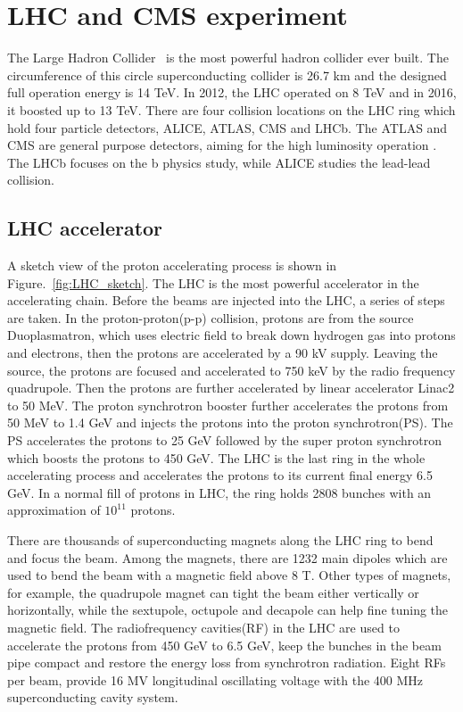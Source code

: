 \chapter{LHC and CMS experiment}

The Large Hadron Collider~\cite{LHC_refer} is the most powerful hadron collider ever built. The circumference of this circle superconducting collider is 26.7 km and the designed full operation energy is 14 TeV. In 2012, the LHC operated on 8 TeV and in 2016, it boosted up to 13 TeV. There are four collision locations on the LHC ring which hold four particle detectors, ALICE, ATLAS, CMS and LHCb. The ATLAS and CMS are general purpose detectors, aiming for the high luminosity operation . The LHCb focuses on the b physics study, while ALICE studies the lead-lead collision.
\section{LHC accelerator}

A sketch view of the proton accelerating process is shown in Figure.~\ref{fig:LHC_sketch}. The LHC is the most powerful accelerator in the accelerating chain. Before the beams are injected into the LHC, a series of steps are taken. In the proton-proton(p-p) collision, protons are from the source Duoplasmatron, which uses electric field to break down hydrogen gas into protons and electrons, then the protons are accelerated by a 90 kV supply. Leaving the source, the protons are focused and accelerated to 750 keV by the radio frequency quadrupole. Then the protons are further accelerated by linear accelerator Linac2 to 50 MeV. The proton synchrotron booster further accelerates the protons from 50 MeV to 1.4 GeV and injects the protons into the proton synchrotron(PS). The PS accelerates the protons to 25 GeV followed by the super proton synchrotron which boosts the protons to 450 GeV. The LHC is the last ring in the whole accelerating process and accelerates the protons to its current final energy 6.5 GeV. In a normal fill of protons in LHC, the ring holds 2808 bunches with an approximation of $10^{11}$ protons.

There are thousands of superconducting magnets along the LHC ring to bend and focus the beam. Among the magnets, there are 1232 main dipoles which are used to bend the beam with a magnetic field above 8 T. Other types of magnets, for example, the quadrupole magnet can tight the beam either vertically or horizontally, while the sextupole, octupole and decapole can help fine tuning the magnetic field. The radiofrequency cavities(RF) in the LHC are used to accelerate the protons from 450 GeV to 6.5 GeV, keep the bunches in the beam pipe compact and restore the energy loss from synchrotron radiation. Eight RFs per beam, provide 16 MV  longitudinal oscillating voltage with the 400 MHz superconducting cavity system. 

